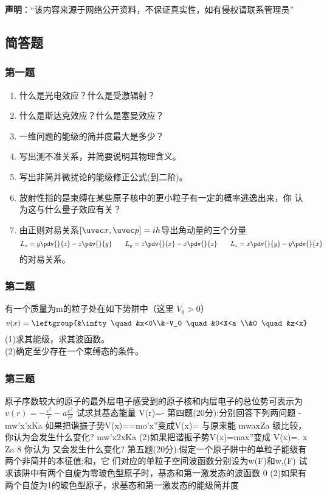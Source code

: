 

\textbf{声明}：“该内容来源于网络公开资料，不保证真实性，如有侵权请联系管理员”

\subsection{简答题}
\subsubsection{第一题}
\begin{enumerate}
\item 什么是光电效应？什么是受激辐射？
\item 什么是斯达克效应？什么是塞曼效应？
\item 一维问题的能级的简并度最大是多少？
\item 写出测不准关系，并简要说明其物理含义。
\item 写出非简并微扰论的能级修正公式(到二阶)。
\item 放射性指的是束缚在某些原子核中的更小粒子有一定的概率逃逸出来，你
认为这与什么量子效应有关？
\item 由正则对易关系$[\uvec x,\uvec p]=ih$导出角动量的三个分量
\begin{equation}
L_x=y\pdv{}{z}-z\pdv{}{y} \qquad L_y=z\pdv{}{x}-x\pdv{}{z} \qquad L_z=x\pdv{}{y}-y\pdv{}{x}~
\end{equation}
的对易关系。
\end{enumerate}
\subsubsection{第二题}
有一个质量为m的粒子处在如下势阱中（这里 $V_0>0$）
\begin{equation}
v(x)=\leftgroup{&\infty   \quad &x<0\\&-V_0 \quad &0<X<a \\&0 \quad &z<x}~
\end{equation}
(1)求其能级，求其波函数。\\
(2)确定至少存在一个束缚态的条件。
\subsubsection{第三题}
原子序数较大的原子的最外层电子感受到的原子核和内层电子的总位势可表示为$v(r)=-\frac{e^2}{r}-a\frac{e^2}{r^2}$
试求其基态能量
 V(r)=-
第四题(20分):分别回答下列两问题
-mw'x’xKa
如果把谐振子势V(x)==mo'x”变成V(x)=
与原来能
mwaxZa
级比较，你认为会发生什么变化?
mw'x2xKa
(2)如果把谐振子势V(x)=max”变成 V(x)=.
x Za
8
你认为
又会发生什么变化?
第五题(20分):假定一个原子阱中的单粒子能级有两个非简并的本征值;和，它
们对应的单粒子空间波函数分别设为w(F)和w,(F)
试求该阱中有两个自旋为零玻色型原子时，基态和第一激发态的波函数
0
(2)如果有两个自旋为1的玻色型原子，求基态和第一激发态的能级简并度
